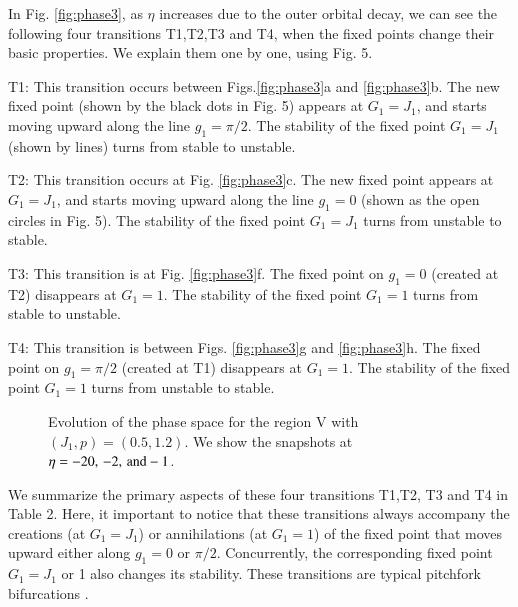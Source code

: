 \documentclass[useAMS,usenatbib,twocolumn]{mn2e}
\begin{document}
In Fig. \ref{fig:phase3}, as $\eta$ increases due to the outer orbital decay, 
we can see the following four transitions T1,T2,T3 and T4, when the fixed points change their basic properties. We explain them one by one, using Fig. 5.

T1: This transition occurs 
 between Figs.\ref{fig:phase3}a and \ref{fig:phase3}b. The new fixed point (shown by the black dots in Fig. 5) appears at $G_1=J_1$, and starts moving upward along the line $g_1=\pi/2$. The stability of the fixed point $G_1=J_1$ (shown by lines) turns from stable to unstable. 

T2: This transition occurs 
 at Fig. \ref{fig:phase3}c. The new fixed point appears at $G_1=J_1$, and starts moving upward along the line $g_1=0$ (shown as the open circles in Fig. 5). The stability of the fixed point $G_1=J_1$ turns from unstable to stable. 


T3:  This transition is at 
Fig. \ref{fig:phase3}f. The fixed point on $g_1=0$ (created at T2) disappears at $G_1=1$. The stability of the fixed point $G_1=1$ turns from stable to unstable.


T4: This transition is between Figs. \ref{fig:phase3}g and \ref{fig:phase3}h.  The fixed point on $g_1=\pi/2$ (created at T1) disappears at $G_1=1$. The stability of the fixed point $G_1=1$ turns from unstable to stable. 


\begin{figure*}
\begin{center}
\caption{Evolution of the phase space for the region V with  $(J_1,p)=(0.5,1.2)$. We show the snapshots at $\eta=-20,\, -2,\, {\rm and} -1$. }
\label{fig:phase5}
\end{center}
\end{figure*}



We summarize the primary aspects of these four transitions T1,T2, T3 and T4 in Table 2. Here, it important to notice that these  transitions  always accompany the creations (at $G_1=J_1$) or annihilations (at $G_1=1$) of the fixed point that moves upward either along $g_1=0$ or $\pi/2$. Concurrently,  the corresponding fixed  point $G_1=J_1$ or 1 also changes  its stability. These transitions are typical pitchfork bifurcations \citep{Strogatz}.
\end{document}
